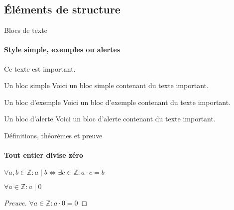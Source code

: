 \documentclass{beamer}
\begin{document}
\subsection{Éléments de structure}
\begin{frame}[label=simmonshall]{Blocs de texte}
    \framesubtitle{Style simple, exemples ou \alert{alertes}}
    \alert{Ce texte} est important.

    \begin{block}{Un bloc simple}
    Voici un bloc simple contenant \alert{du texte important}.
    \end{block}
    \begin{exampleblock}{Un bloc d'exemple}
    Voici un bloc d'exemple contenant \alert{du texte important}.
    \end{exampleblock}
    \begin{alertblock}{Un bloc d'alerte}
    Voici un bloc d'alerte contenant \alert{du texte important}.
    \end{alertblock}
\end{frame}

\begin{frame}[label=proof]{Définitions, théorèmes et preuve}
\framesubtitle{Tout entier divise zéro}
\begin{definition}
$\forall a,b\in\mathbb{Z}: a\mid b\iff\exists c\in\mathbb{Z}:a\cdot c=b$
\end{definition}
\begin{theorem}
$\forall a\in\mathbb{Z}: a\mid 0$
\end{theorem}
\begin{proof}[Preuve\nopunct]
$\forall a\in\mathbb{Z}: a\cdot 0=0$
\end{proof}
\end{frame}
\end{document}
